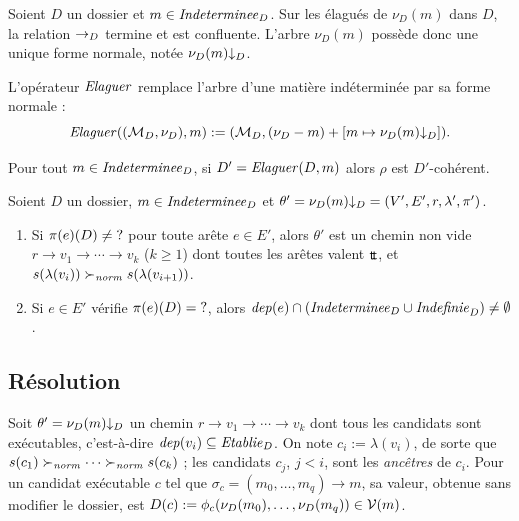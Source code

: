 \documentclass[review]{jflart}
\begin{document}
\begin{prop}\label{prop:norm}
Soient \(D\) un dossier et \(m\in\mathit{Indeterminee}_D\). Sur les élagués de \(\nu_D(m)\)
dans \(D\), la relation \(\to_{D}\) termine et est confluente. L'arbre
\(\nu_D(m)\) possède donc une unique forme normale, notée \({\nu_D(m)}{\downarrow_D}\).
\end{prop}

L'opérateur \(\mathit{Elaguer}\) remplace l'arbre d'une matière indéterminée par sa
forme normale :
\begin{equation}
\mathit{Elaguer}((\mathcal{M}_D,\nu_D),m):=(\mathcal{M}_D,(\nu_D-m)+[m\mapsto{\nu_D(m)}{\downarrow_D}]).
\label{eq:prune}
\end{equation}

\begin{prop}\label{prop:coh-prune}
Pour tout \(m\in\mathit{Indeterminee}_D\), si $D'=\mathit{Elaguer}(D,m)$ alors \(\rho\) est \(D'\)-cohérent.
\end{prop}

\begin{lemm}\label{lem:linear}
Soient \(D\) un dossier, \(m\in\mathit{Indeterminee}_D\) et
\(\theta'={\nu_D(m)}{\downarrow_D}=(V',E',r,\lambda',\pi')\).
\begin{enumerate}
\item Si \(\pi(e)(D)\neq \mathord{?}\) pour toute arête \(e\in E'\), alors
  \(\theta'\) est un chemin non vide \(r\to v_1\to\cdots\to v_k\) (\(k\geq1\))
  dont toutes les arêtes valent \({\mathsf{t\!t}}\), et
  \(s(\lambda(v_i))\succ_{\mathit{norm}} s(\lambda(v_{i+1}))\).
\item Si \(e\in E'\) vérifie \(\pi(e)(D)=\mathord{?}\), alors
  \(\mathit{dep}(e)\cap(\mathit{Indeterminee}_D\cup\mathit{Indefinie}_D)\neq\emptyset\).
\end{enumerate}
\end{lemm}

\subsection{Résolution}\label{sec:resolution}

Soit \(\theta'={\nu_D(m)}{\downarrow_D}\) un chemin \(r\to v_1\to\cdots\to v_k\) dont tous
les candidats sont exécutables, c'est-à-dire \(\mathit{dep}(v_i)\subseteq\mathit{Etablie}_D\).
On note \(c_i:=\lambda(v_i)\), de sorte que \(s(c_1)\succ_{\mathit{norm}}\cdots\succ_{\mathit{norm}} s(c_k)\) ;
les candidats \(c_j\), \(j<i\), sont les \emph{ancêtres} de \(c_i\). Pour un
candidat exécutable \(c\) tel que \(\sigma_c=(m_0,\ldots,m_q)\to m\), sa valeur,
obtenue sans modifier le dossier, est
\(D(c):=\phi_c(\nu_D(m_0),\ldots,\nu_D(m_q))\in\mathcal{V}(m)\).
\end{document}
